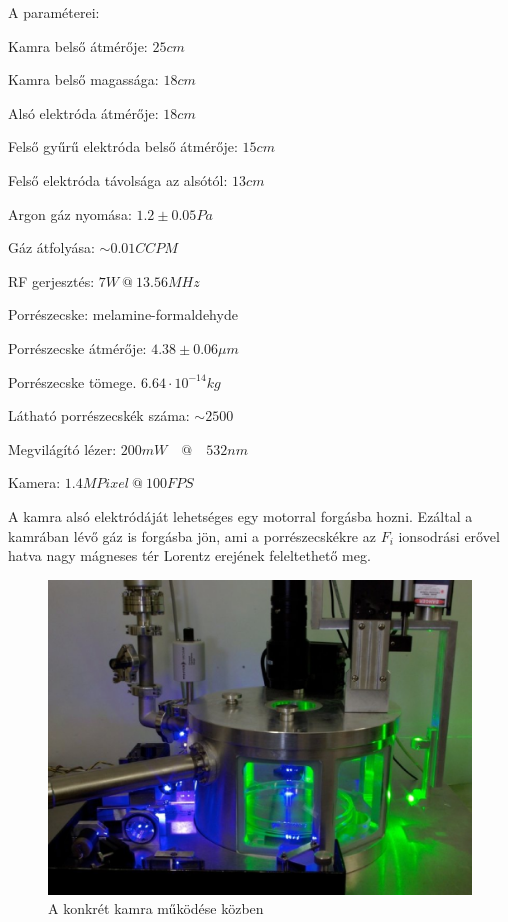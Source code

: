 	\noindent A paraméterei:
	\begin{myitemize*}
		\item Kamra belső átmérője: $25cm$
		\item Kamra belső magassága: $18cm$
		\item Alsó elektróda átmérője: $18cm$
		\item Felső gyűrű elektróda belső átmérője: $15cm$
		\item Felső elektróda távolsága az alsótól: $13cm$
		\item Argon gáz nyomása: $1.2\pm0.05 Pa$
		\item Gáz átfolyása: $\sim 0.01 CCPM$
		\item RF gerjesztés: $7W\ @ \ 13.56 MHz$
		\item Porrészecske: melamine-formaldehyde
		\item Porrészecske átmérője: $4.38\pm 0.06 \mu m$
		\item Porrészecske tömege. $6.64\cdot10^{-14} kg$
		\item Látható porrészecskék száma: $\sim 2500$
		\item Megvilágító lézer: $200mW\quad @ \quad 532nm$
		\item Kamera: $1.4MPixel\ @\ 100 FPS$
	\end{myitemize*}
	A kamra alsó elektródáját lehetséges egy motorral forgásba hozni. Ezáltal a kamrában lévő gáz is
	forgásba jön, ami a porrészecskékre az $F_i$ ionsodrási erővel hatva nagy mágneses tér Lorentz
	erejének feleltethető meg.
	\begin{figure}[H]
		\centering
		\includegraphics[width=0.9\columnwidth]{figures/eps/dusty2.eps}
		\caption{A konkrét kamra működése közben} 
		\label{fig:kamra}
	\end{figure}
	
